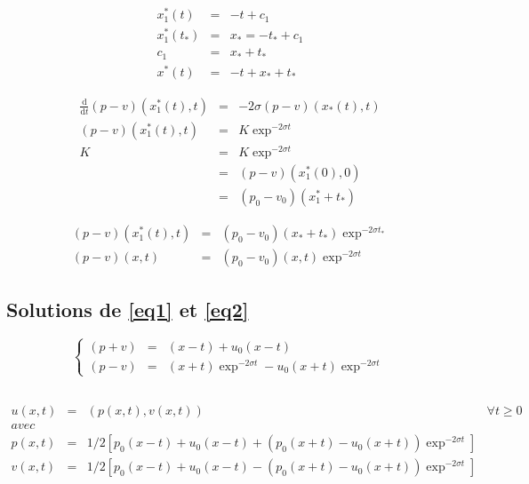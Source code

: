 \documentclass[a4paper,11pt]{article}
\begin{document}
\begin{equation*}
\begin{array}{rcl}
    x_{1}^{*}(t) &=& -t +c_{1} \\
    x_{1}^{*}(t_{*}) &=& x_{*} = -t_{*}+c_{1} \\
    c_{1} &=& x_{*} + t_{*} \\
    x^{*}(t) &=& -t + x_{*} + t_{*}
\end{array}
\end{equation*}

\begin{equation*}
\begin{array}{rcl}
    \frac{\mathrm{d}}{\mathrm{d}t}(p-v)(x_{1}^{*}(t), t) &=& -2\sigma (p-v)(x_{*}(t), t) \\
    (p-v)(x_{1}^{*}(t), t) &=& K \exp^{-2\sigma t} \\
    K &=& K \exp^{-2\sigma t} \\
    &=& (p-v)(x_{1}^{*}(0), 0) \\
    &=& (p_{0}-v_{0})(x_{1}^{*} + t_{*})
\end{array}
\end{equation*}

\begin{equation*}
\begin{array}{rcl}
    (p-v)(x_{1}^{*}(t), t) &=& (p_{0}-v_{0})(x_{*} + t_{*})\exp^{-2\sigma t_{*}} \\
    (p-v)(x,t) &=& (p_{0}-v_{0})(x,t)\exp^{-2\sigma t} 
\end{array}
\end{equation*}

\subsection*{Solutions de \ref{eq1} et \ref{eq2}}

\begin{equation*}
\left\{
\begin{array}{rcl}
    (p+v) &=& (x - t) + u_{0}(x - t) \\
    (p-v) &=& (x + t) \exp^{-2\sigma t} - u_{0}(x + t) \exp^{-2\sigma t}
\end{array}
\right.
\end{equation*}

\subsection*{}

\begin{equation}
\begin{array}{rcll}
    u(x,t) &=& (p(x,t), v(x,t)) & \forall t \ge 0 \\
    avec & & & \\
    p(x,t) &=& 1/2\left[p_{0}(x - t) + u_{0}(x - t) + (p_{0}(x + t) - u_{0}(x + t))\exp^{-2\sigma t} \right] & \\
    v(x,t) &=& 1/2\left[p_{0}(x - t) + u_{0}(x - t) - (p_{0}(x + t) - u_{0}(x + t))\exp^{-2\sigma t} \right] &
\end{array}
\end{equation}
\end{document}

